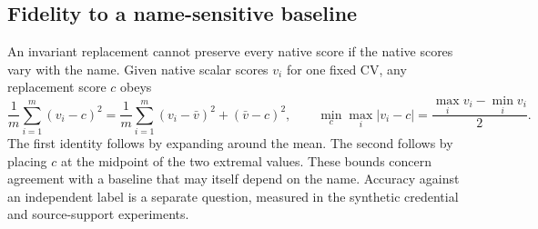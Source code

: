 \subsection{Fidelity to a name-sensitive baseline}

An invariant replacement cannot preserve every native score if the native scores vary with the name. Given native scalar scores \(v_i\) for one fixed CV, any replacement score \(c\) obeys
\[
  \frac{1}{m}\sum_{i=1}^{m}(v_i-c)^2
   = \frac{1}{m}\sum_{i=1}^{m}(v_i-\bar v)^2+(\bar v-c)^2,
  \qquad
  \min_c\max_i |v_i-c|=\frac{\max_i v_i-\min_i v_i}{2}.
\]
The first identity follows by expanding around the mean. The second follows by placing \(c\) at the midpoint of the two extremal values. These bounds concern agreement with a baseline that may itself depend on the name. Accuracy against an independent label is a separate question, measured in the synthetic credential and source-support experiments.
